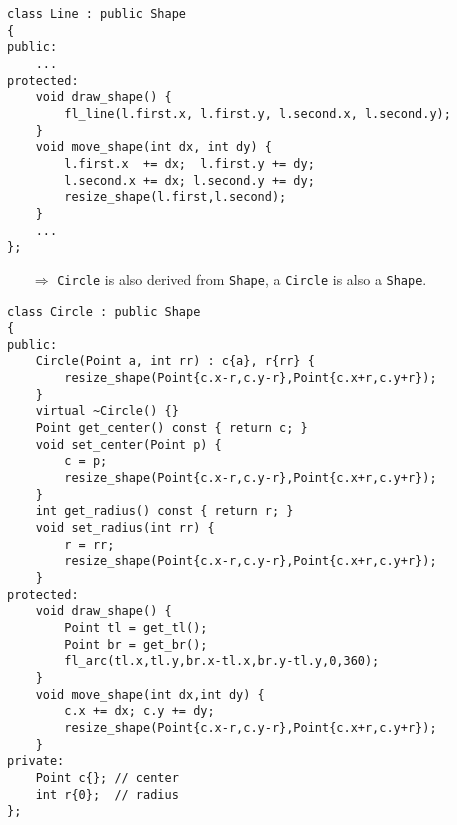 \documentclass[10pt]{article}
\begin{document}
\begin{lstlisting}
class Line : public Shape
{
public:
    ...
protected:
    void draw_shape() {
        fl_line(l.first.x, l.first.y, l.second.x, l.second.y);
    }
    void move_shape(int dx, int dy) {
        l.first.x  += dx;  l.first.y += dy;
        l.second.x += dx; l.second.y += dy;
        resize_shape(l.first,l.second);
    }
    ...
};
\end{lstlisting}
\begin{enumerate}
\item[$\Rightarrow$] \texttt{Circle} is also derived from \texttt{Shape}, a \texttt{Circle} is also a \texttt{Shape}.
\end{enumerate}
\begin{lstlisting}
class Circle : public Shape
{
public:
    Circle(Point a, int rr) : c{a}, r{rr} {
        resize_shape(Point{c.x-r,c.y-r},Point{c.x+r,c.y+r});
    }
    virtual ~Circle() {}
    Point get_center() const { return c; }
    void set_center(Point p) {
        c = p;
        resize_shape(Point{c.x-r,c.y-r},Point{c.x+r,c.y+r});
    }
    int get_radius() const { return r; }
    void set_radius(int rr) {
        r = rr;
        resize_shape(Point{c.x-r,c.y-r},Point{c.x+r,c.y+r});
    }
protected:
    void draw_shape() {
        Point tl = get_tl();
        Point br = get_br();
        fl_arc(tl.x,tl.y,br.x-tl.x,br.y-tl.y,0,360);
    }
    void move_shape(int dx,int dy) {
        c.x += dx; c.y += dy;
        resize_shape(Point{c.x-r,c.y-r},Point{c.x+r,c.y+r});
    }
private:
    Point c{}; // center
    int r{0};  // radius
};
\end{lstlisting}
%
%
\end{document}
